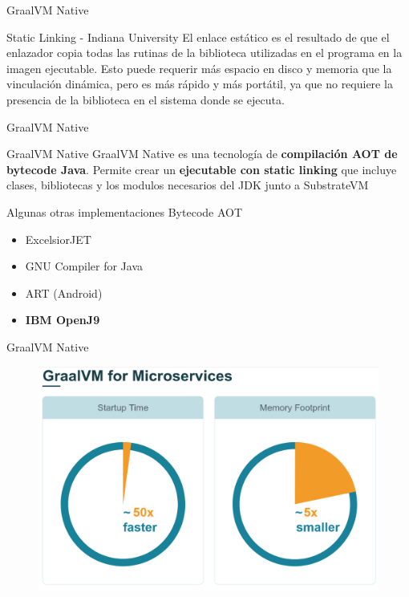 \documentclass[aspectratio=169]{beamer}
\begin{document}
\begin{frame}{GraalVM Native}
	
	\begin{block}{Static Linking - Indiana University}
		El enlace estático es el resultado de que el enlazador copia todas las rutinas de la biblioteca utilizadas en el programa en la imagen ejecutable. Esto puede requerir más espacio en disco y memoria que la vinculación dinámica, pero es más rápido y más portátil, ya que no requiere la presencia de la biblioteca en el sistema donde se ejecuta.
	\end{block}
	
\end{frame}


\begin{frame}{GraalVM Native}
	
	\begin{exampleblock}{GraalVM Native}
	GraalVM Native es una tecnología de \textbf{compilación AOT de bytecode Java}. Permite crear un \textbf{ejecutable con static linking} que incluye clases, bibliotecas y los modulos necesarios del JDK junto a SubstrateVM
	\end{exampleblock}
	
\end{frame}




\begin{frame}{Algunas otras implementaciones Bytecode AOT}
	\begin{itemize}
		\item ExcelsiorJET
		\item GNU Compiler for Java
		\item ART (Android)
		\item \textbf{IBM OpenJ9}
	\end{itemize}

\end{frame}




\begin{frame}{GraalVM Native}
	\begin{figure}
		\centering
		\includegraphics[width=0.7\linewidth]{Images/ventajasnative}
	\end{figure}
\end{frame}
\end{document}
